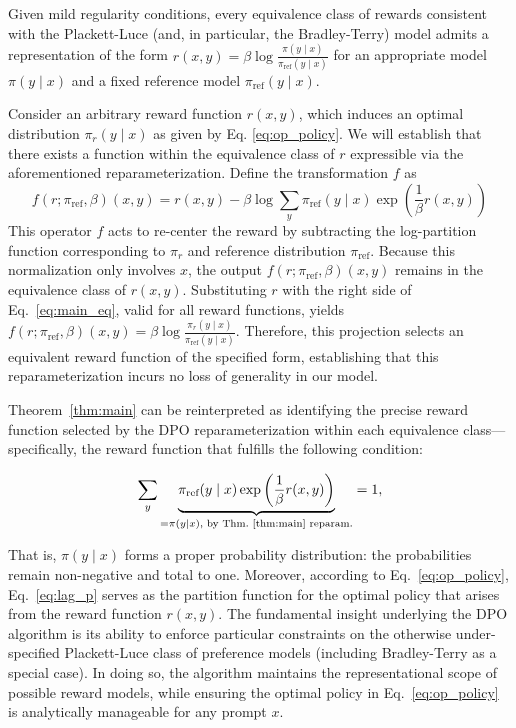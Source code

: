 \begin{theorem}\label{thm:main}
    Given mild regularity conditions, every equivalence class of rewards consistent with the Plackett-Luce (and, in particular, the Bradley-Terry) model admits a representation of the form ${r(x, y) = \beta \log \frac{\pi(y\mid x)}{\pi_\text{ref}(y\mid x)}}$ for an appropriate model $\pi(y\mid x)$ and a fixed reference model $\pi_\text{ref}(y \mid x)$.
\end{theorem}

\begin{sproof}
    Consider an arbitrary reward function $r(x, y)$, which induces an optimal distribution $\pi_r(y \mid x)$ as given by Eq. \ref{eq:op_policy}. We will establish that there exists a function within the equivalence class of $r$ expressible via the aforementioned reparameterization. Define the transformation $f$ as  
\begin{equation}
    f(r; \pi_\text{ref}, \beta)(x, y) = r(x, y) - \beta\log\sum_{y}\pi_\text{ref}(y\mid x)\exp\left(\frac{1}{\beta}r(x, y)\right)
\end{equation}
This operator $f$ acts to re-center the reward by subtracting the log-partition function corresponding to $\pi_r$ and reference distribution $\pi_\text{ref}$. Because this normalization only involves $x$, the output $f(r; \pi_\text{ref}, \beta)(x, y)$ remains in the equivalence class of $r(x, y)$. Substituting $r$ with the right side of Eq.~\ref{eq:main_eq}, valid for all reward functions, yields $f(r; \pi_\text{ref}, \beta)(x, y) = \beta \log \frac{\pi_r(y\mid x)}{\pi_\text{ref}(y\mid x)}$. Therefore, this projection selects an equivalent reward function of the specified form, establishing that this reparameterization incurs no loss of generality in our model.
\end{sproof}

Theorem~\ref{thm:main} can be reinterpreted as identifying the precise reward function selected by the DPO reparameterization within each equivalence class—specifically, the reward function that fulfills the following condition:

\begin{equation}\label{eq:lag_p}
     \sum_{y}\underbrace{\pi_\text{ref}(y\mid x)\exp\left(\frac{1}{\beta}r(x, y)\right)}_{=\pi(y\mid x)\text{, by Thm.~\ref{thm:main} reparam.}} = 1,
\end{equation}

That is, $\pi(y\mid x)$ forms a proper probability distribution: the probabilities remain non-negative and total to one. Moreover, according to Eq.~\ref{eq:op_policy}, Eq.~\ref{eq:lag_p} serves as the partition function for the optimal policy that arises from the reward function $r(x, y)$. The fundamental insight underlying the DPO algorithm is its ability to enforce particular constraints on the otherwise under-specified Plackett-Luce class of preference models (including Bradley-Terry as a special case). In doing so, the algorithm maintains the representational scope of possible reward models, while ensuring the optimal policy in Eq.~\ref{eq:op_policy} is analytically manageable for any prompt $x$.

